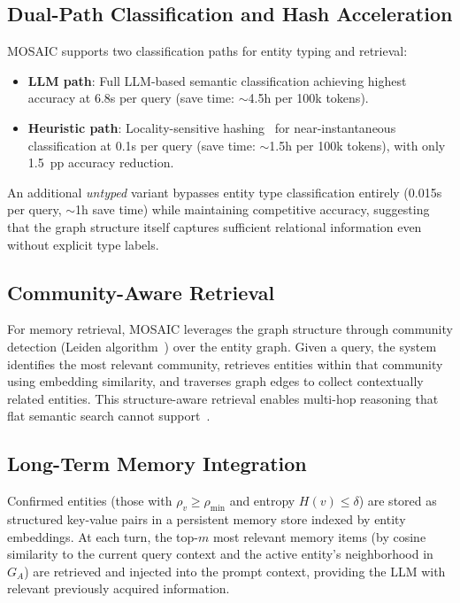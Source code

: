 \documentclass[10pt,twocolumn]{article}
\begin{document}
\subsection{Dual-Path Classification and Hash Acceleration}
\label{sec:hash}

MOSAIC supports two classification paths for entity typing and retrieval:

\begin{itemize}[noitemsep,topsep=3pt]
  \item \textbf{LLM path}: Full LLM-based semantic classification achieving
    highest accuracy at 6.8s per query (save time: $\sim$4.5h per 100k
    tokens).
  \item \textbf{Heuristic path}: Locality-sensitive
    hashing~\citep{indyk1998approximate} for near-instantaneous classification at
    0.1s per query (save time: $\sim$1.5h per 100k tokens), with only
    1.5~pp accuracy reduction.
\end{itemize}

An additional \emph{untyped} variant bypasses entity type classification
entirely (0.015s per query, $\sim$1h save time) while maintaining
competitive accuracy, suggesting that the graph structure itself captures
sufficient relational information even without explicit type labels.

\subsection{Community-Aware Retrieval}
\label{sec:retrieval}

For memory retrieval, MOSAIC leverages the graph structure through
community detection (Leiden algorithm~\citep{traag2019louvain}) over the entity
graph. Given a query, the system identifies the most relevant community,
retrieves entities within that community using embedding similarity, and
traverses graph edges to collect contextually related entities. This
structure-aware retrieval enables multi-hop reasoning that flat semantic
search cannot support~\citep{lewis2020retrieval, gao2023retrieval}.

\subsection{Long-Term Memory Integration}
\label{sec:memory_integration}

Confirmed entities (those with $\rho_v \geq \rho_{\min}$ and entropy
$H(v) \leq \delta$) are stored as structured key-value pairs in a persistent
memory store indexed by entity embeddings. At each turn, the top-$m$ most
relevant memory items (by cosine similarity to the current query context and
the active entity's neighborhood in $G_A$) are retrieved and injected into
the prompt context, providing the LLM with relevant previously acquired
information.
\end{document}
